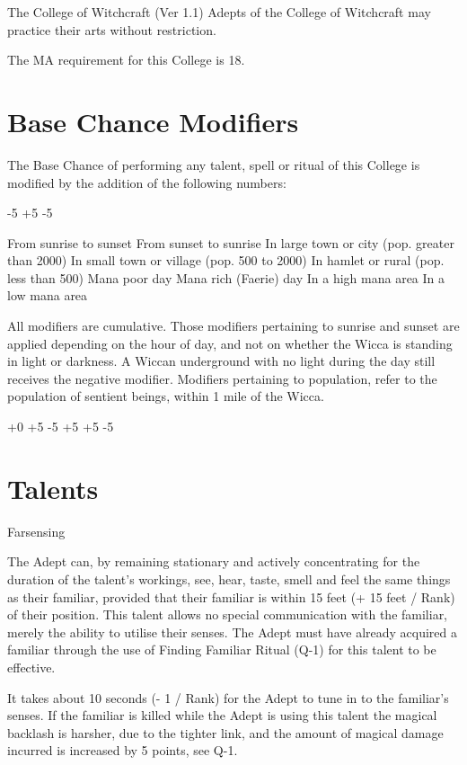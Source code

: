 \begin{Chapter}{The College of Witchcraft (Ver 1.1)}
Adepts  of  the  College  of  Witchcraft  may  practice 
their arts without restriction. 

The MA requirement for this College is 18. 


\section{Base Chance Modifiers}

The Base Chance of performing any talent, spell or 
ritual of this College is modified by the addition of 
the following numbers: 

-5 
+5 
-5 

From sunrise to sunset 
From sunset to sunrise 
In large town or city (pop. greater than 
2000) 
In small town or village (pop. 500 to 2000)  
In hamlet or rural (pop. less than 500)  
Mana poor day 
Mana rich (Faerie) day 
In a high mana area 
In a low mana area 

All modifiers are cumulative.  Those modifiers pertaining to sunrise
and sunset are applied depending on the hour of day, and not on
whether the Wicca is standing in light or darkness.  A Wiccan
underground with no light during the day still receives the negative
modifier.  Modifiers pertaining to population, refer to the population
of sentient beings, within 1 mile of the Wicca.

+0 
+5 
-5 
 +5 
+5 
-5 


\section{Talents}

\begin{talent}[T-1]{Farsensing }

\begin{effects}
 The  Adept  can,  by  remaining  stationary 
and  actively  concentrating  for  the  duration  of  the 
talent’s  workings,  see,  hear,  taste,  smell  and  feel 
the  same  things  as  their  familiar,  provided  that 
their familiar is within 15 feet (+ 15 feet / Rank) of 
their  position.  This  talent  allows  no  special  communication  with the  familiar,  merely  the  ability  to 
utilise  their  senses.  The  Adept  must  have  already 
acquired  a  familiar  through  the  use  of  Finding 
Familiar Ritual (Q-1) for this talent to be effective. 

It takes about 10 seconds (- 1 / Rank) for the Adept to tune in to the
familiar’s senses. If the familiar is killed while the Adept is using
this talent the magical backlash is harsher, due to the tighter link,
and the amount of magical damage incurred is increased by 5 points,
see Q-1.


\end{effects}
\end{talent}
\end{Chapter}
